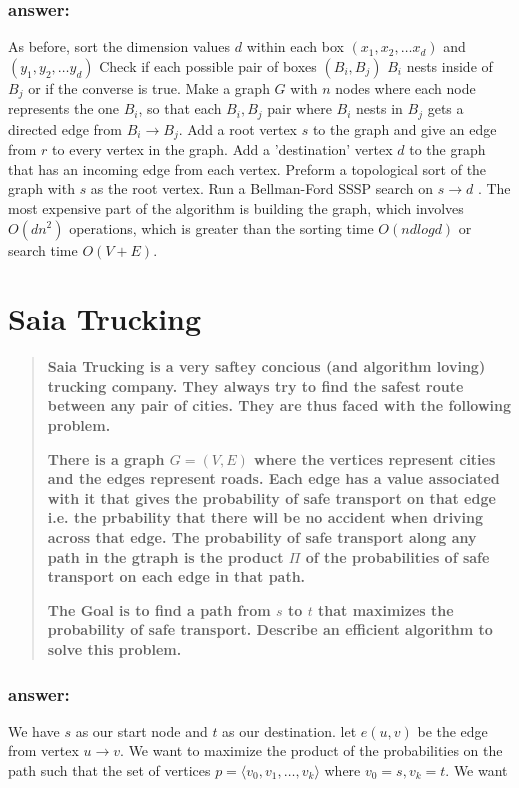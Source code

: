 \documentclass[titlepage]{article}
\theoremstyle{definition}
\begin{document}
  \subsubsection{answer:}
    As before, sort the dimension values $d$ within each box $(x_1, x_2, \dots x_d)$ and
    $(y_1, y_2, \dots y_d)$ Check if each possible pair of boxes $(B_i, B_j)$
    $B_i$ nests inside of $B_j$ or if the converse is true. Make a graph $G$
    with $n$ nodes where each node represents the one $B_i$, so that each
    $B_i, B_j$ pair where $B_i$ nests in $ B_j$ gets a directed edge from $B_i
    \to B_j$. Add a root vertex $s$ to the graph and give an edge from $r$ to
    every vertex in the graph. Add a 'destination' vertex $d$ to the graph
    that has an incoming edge from each vertex. Preform a topological sort of the
    graph with $s$ as the root vertex. Run a Bellman-Ford SSSP search on $s
    \rightarrow d$ . The most expensive part of the algorithm is building the
    graph, which involves $O(dn^2)$ operations, which is greater than the
    sorting time $O(nd log d)$ or search time $O(V + E)$. 



\section{Saia Trucking}
\begin{quote}
  \textbf{Saia Trucking is a very saftey concious (and algorithm loving)
  trucking company. They always try to find the safest route between any pair
of cities. They are thus faced with the following problem.}

\textbf{There is a graph $G = (V,E)$ where the vertices represent cities and the edges
represent roads. Each edge has a value associated with it that gives the
probability of safe transport on that edge i.e. the prbability that there will
be no accident when driving across that edge. The probability of safe transport
along any path in the gtraph is the product $\Pi$ of the probabilities of safe
transport on each edge in that path.}

\textbf{The Goal is to find a path from $s$ to $t$ that maximizes the probability of
safe transport. Describe an efficient algorithm to solve this problem.  }
\end{quote}
\subsubsection{answer:}
We have $s$ as our start node and $t$ as our destination. let $e(u,v)$ be the
edge from vertex $u \rightarrow v$. We want to maximize the product of the
probabilities on the path such that the set of vertices $p = \langle v_0, v_1,
\dots, v_k \rangle$ where $v_0 = s, v_k = t$. We want
\end{document}
